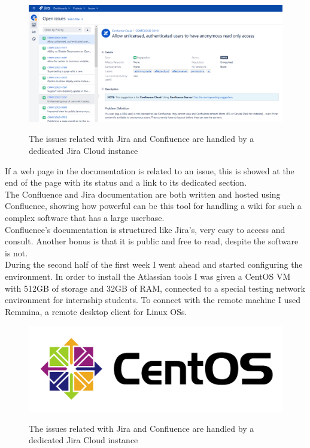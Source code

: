 	\begin{figure}[H]
		\centering
		\includegraphics[width=1\textwidth]{resources/confluence_documentation_issues_1}\\
		\caption{The issues related with Jira and Confluence are handled by a dedicated Jira Cloud instance}
	\end{figure}
	If a web page in the documentation is related to an issue, this is showed at the end of the page with its status and a link to its dedicated section.\\
	The Confluence and Jira documentation are both written and hosted using Confluence, showing how powerful can be this tool for handling a wiki for such a complex software that has a large userbase.\\
	Confluence's documentation is structured like Jira's, very easy to access and consult.	
	Another bonus is that it is public and free to read, despite the software is not.\\
	During the second half of the first week I went ahead and started configuring the environment.
	In order to install the Atlassian tools I was given a CentOS VM with 512GB of storage and 32GB of RAM, connected to a special testing network environment for internship students.
	To connect with the remote machine I used Remmina, a remote desktop client for Linux OSs.
	\begin{figure}[H]
		\centering
		\includegraphics[width=.6\textwidth]{resources/centos_logo}\\
		\caption{The issues related with Jira and Confluence are handled by a dedicated Jira Cloud instance}
	\end{figure}
	
